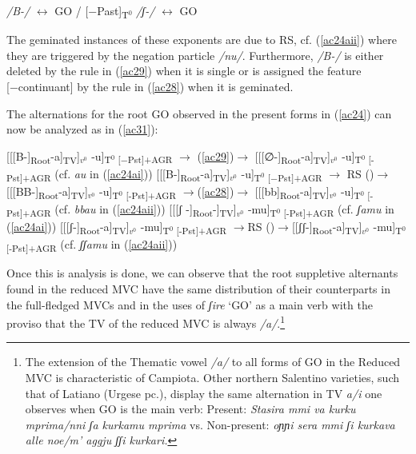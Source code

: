 \documentclass[output=paper]{langscibook}
\begin{document}
\ea\label{ac30}
    \ea \label{ac30a}\textit{/B-/} $\longleftrightarrow$ GO / \underline{\hspace{2em}}  [−Past]\textsubscript{T$^0$}
    \ex\label{ac30b} \textit{/ʃ-/} $\longleftrightarrow$ GO
    \z
\z

The geminated instances of these exponents are due to RS, cf. (\ref{ac24aii}) where they are triggered by the negation particle \textit{/nu/}. Furthermore, \textit{/B-/} is either deleted by the rule in (\ref{ac29}) when it is single or is assigned the feature [−continuant] by the rule in (\ref{ac28}) when it is geminated.

The alternations for the root GO observed in the present forms in (\ref{ac24}) can now be analyzed as in (\ref{ac31}):

\ea\label{ac31}
    \ea \label{ac31a}{[[[B-]}\textsubscript{Root}-a]\textsubscript{TV}]$_{v^0}$ -u]\textsubscript{T$^0$ [−Pst]+AGR} $\rightarrow$ (\ref{ac29})$\rightarrow$ [[[∅-]\textsubscript{Root}-a]\textsubscript{TV}]$_{v^0}$ -u]\textsubscript{T$^0$ [-Pst]+AGR}        (cf. \textit{au} in (\ref{ac24ai}))
    \ex \label{ac31b}{[[[B-]}\textsubscript{Root}-a]\textsubscript{TV}]$_{v^0}$ -u]\textsubscript{T$^0$ [−Pst]+AGR} $\rightarrow$ RS ()$\rightarrow$ [[[BB-]\textsubscript{Root}-a]\textsubscript{TV}]$_{v^0}$ -u]\textsubscript{T$^0$ [-Pst]+AGR}      $\rightarrow$(\ref{ac28})$\rightarrow$ [[[bb]\textsubscript{Root}-a]\textsubscript{TV}]$_{v^0}$ -u]\textsubscript{T$^0$ [-Pst]+AGR}   (cf. \textit{bbau} in (\ref{ac24aii}))
    \ex \label{ac31c}{[[[ʃ -]}\textsubscript{Root}-]\textsubscript{TV}]$_{v^0}$ -mu]\textsubscript{T$^0$ [-Pst]+AGR} (cf. \textit{ʃamu} in (\ref{ac24ai}))
    \ex \label{ac31d}{[[[ʃ-]}\textsubscript{Root}-a]\textsubscript{TV}]$_{v^0}$ -mu]\textsubscript{T$^0$ [-Pst]+AGR} $\rightarrow$RS ()$\rightarrow$[[ʃʃ-]\textsubscript{Root}-a]\textsubscript{TV}]$_{v^0}$ -mu]\textsubscript{T$^0$ [-Pst]+AGR}           (cf. \textit{ʃʃamu} in (\ref{ac24aii}))
    \z
\z

Once this is analysis is done, we can observe that the root suppletive alternants found in the reduced MVC have the same distribution of their counterparts in the full-fledged MVCs and in the uses of \textit{ʃire} ‘GO’ as a main verb with the proviso that the TV of the reduced MVC is always \textit{/a/}.\footnote{The extension of the Thematic vowel \textit{/a/} to all forms of GO in the Reduced MVC is characteristic of Campiota.  Other northern  Salentino varieties, such that of Latiano (Urgese pc.), display the same alternation in TV \textit{a/i} one observes when GO is the main verb: Present: \textit{Stasira mmi va kurku mprima\slash nni ʃa kurkamu mprima} vs. Non-present: \textit{oɲɲi sera mmi ʃi kurkava alle noe\slash m’ aggju ʃʃi kurkari.}}
\end{document}
